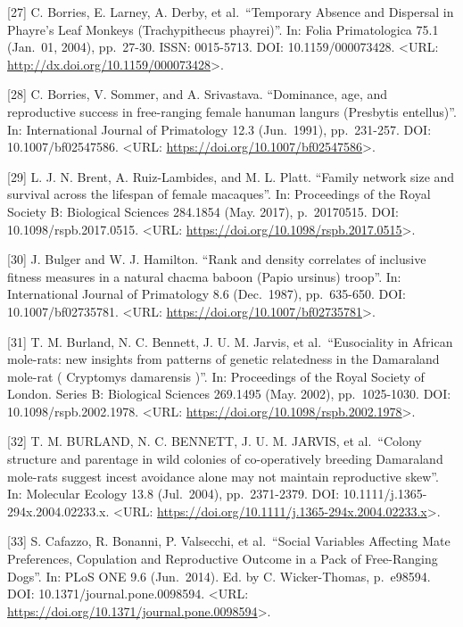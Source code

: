 \documentclass[
]{article}
\begin{document}
{[}27{]} C. Borries, E. Larney, A. Derby, et al.~``Temporary Absence and
Dispersal in Phayre's Leaf Monkeys (Trachypithecus phayrei)''. In: Folia
Primatologica 75.1 (Jan.~01, 2004), pp.~27-30. ISSN: 0015-5713. DOI:
10.1159/000073428. \textless URL:
\url{http://dx.doi.org/10.1159/000073428}\textgreater.

{[}28{]} C. Borries, V. Sommer, and A. Srivastava. ``Dominance, age, and
reproductive success in free-ranging female hanuman langurs (Presbytis
entellus)''. In: International Journal of Primatology 12.3 (Jun.~1991),
pp.~231-257. DOI: 10.1007/bf02547586. \textless URL:
\url{https://doi.org/10.1007/bf02547586}\textgreater.

{[}29{]} L. J. N. Brent, A. Ruiz-Lambides, and M. L. Platt. ``Family
network size and survival across the lifespan of female macaques''. In:
Proceedings of the Royal Society B: Biological Sciences 284.1854 (May.
2017), p.~20170515. DOI: 10.1098/rspb.2017.0515. \textless URL:
\url{https://doi.org/10.1098/rspb.2017.0515}\textgreater.

{[}30{]} J. Bulger and W. J. Hamilton. ``Rank and density correlates of
inclusive fitness measures in a natural chacma baboon (Papio ursinus)
troop''. In: International Journal of Primatology 8.6 (Dec.~1987),
pp.~635-650. DOI: 10.1007/bf02735781. \textless URL:
\url{https://doi.org/10.1007/bf02735781}\textgreater.

{[}31{]} T. M. Burland, N. C. Bennett, J. U. M. Jarvis, et
al.~``Eusociality in African mole-rats: new insights from patterns of
genetic relatedness in the Damaraland mole-rat ( Cryptomys damarensis
)''. In: Proceedings of the Royal Society of London. Series B:
Biological Sciences 269.1495 (May. 2002), pp.~1025-1030. DOI:
10.1098/rspb.2002.1978. \textless URL:
\url{https://doi.org/10.1098/rspb.2002.1978}\textgreater.

{[}32{]} T. M. BURLAND, N. C. BENNETT, J. U. M. JARVIS, et al.~``Colony
structure and parentage in wild colonies of co-operatively breeding
Damaraland mole-rats suggest incest avoidance alone may not maintain
reproductive skew''. In: Molecular Ecology 13.8 (Jul.~2004),
pp.~2371-2379. DOI: 10.1111/j.1365-294x.2004.02233.x. \textless URL:
\url{https://doi.org/10.1111/j.1365-294x.2004.02233.x}\textgreater.

{[}33{]} S. Cafazzo, R. Bonanni, P. Valsecchi, et al.~``Social Variables
Affecting Mate Preferences, Copulation and Reproductive Outcome in a
Pack of Free-Ranging Dogs''. In: PLoS ONE 9.6 (Jun.~2014). Ed. by C.
Wicker-Thomas, p.~e98594. DOI: 10.1371/journal.pone.0098594.
\textless URL:
\url{https://doi.org/10.1371/journal.pone.0098594}\textgreater.
\end{document}
